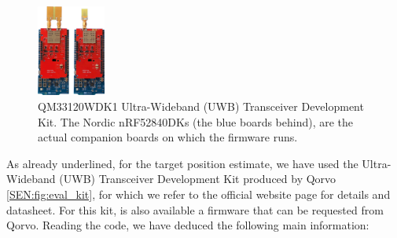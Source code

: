 \begin{figure}
    \centering
    \includegraphics[width=0.2\textwidth]{images/QM33120WDK1_PDP_v2.png}
    \caption{QM33120WDK1 Ultra-Wideband (UWB) Transceiver Development Kit. The Nordic nRF52840DKs (the blue boards behind), are the actual companion boards on which the firmware runs.}
    \label{SEN:fig:eval_kit}
\end{figure}

As already underlined, for the target position estimate, we have used the Ultra-Wideband (UWB) Transceiver Development Kit produced by Qorvo \autoref{SEN:fig:eval_kit}, for which we refer to the official website page\cite{UWBQorvo} for details and datasheet\cite{UWBDatasheet}. For this kit, is also available a firmware that can be requested from Qorvo. Reading the code, we have deduced the following main information:
